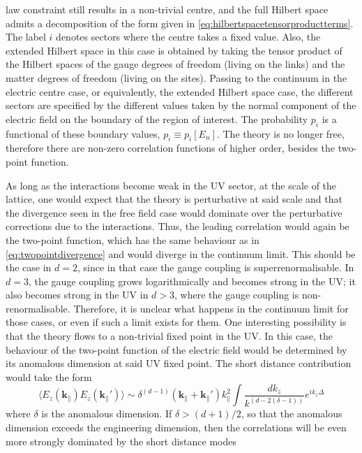 law constraint still results in a non-trivial centre, and the full Hilbert
space admits a decomposition of the form given in
\eqref{eq:hilbertspacetensorproductterms}. The label $i$ denotes sectors where
the centre takes a fixed value. Also, the extended Hilbert space in this case
is obtained by taking the tensor product of the Hilbert spaces of the gauge
degrees of freedom (living on the links) and the matter degrees of freedom
(living on the sites). Passing to the continuum in the electric centre case, or
equivalently, the extended Hilbert space case, the different sectors are
specified by the different values taken by the normal component of the electric
field on the boundary of the region of interest. The probability $p_i$ is a 
functional of these boundary values, $p_i\equiv p_i\left[E_n\right]$. The
theory is no longer free, therefore there are non-zero correlation functions of
higher order, besides the two-point function.
\par As long as the interactions become weak in the UV sector, at the scale
of the lattice, one would expect that the theory is perturbative at said scale
and that the divergence seen in the free field case would dominate over the
perturbative corrections due to the interactions. Thus, the leading correlation
would again be the two-point function, which has the same behaviour as in
\eqref{eq:twopointdivergence} and would diverge in the continuum limit. This
should be the case in $d=2$, since in that case the gauge coupling is 
superrenormalisable. In $d=3$, the gauge coupling grows logarithmically and
becomes strong in the UV; it also becomes strong in the UV in $d>3$, where
the gauge coupling is non-renormalisable. Therefore, it is unclear what happens
in the continuum limit for those cases, or even if such a limit exists for
them. One interesting possibility is that the theory flows to a non-trivial
fixed point in the UV. In this case, the behaviour of the two-point function
of the electric field would be determined by its anomalous dimension at said UV
fixed point. The short distance contribution would take the form
\begin{equation}
  \langle E_z(\mathbf{k}_{\|})E_z(\mathbf{k}_{\|}')\rangle \sim
\delta^{(d-1)}(\mathbf{k}_{\|}+\mathbf{k}_{\|}')k^2_{\|}\int\frac{dk_z}{k^{(d-2(\delta-1))}}e^{ik_z\Delta}
\end{equation}
where $\delta$ is the anomalous dimension. If $\delta>(d+1)/2$, so that
the anomalous dimension exceeds the engineering dimension, then the
correlations will be even more strongly dominated by the short distance modes
